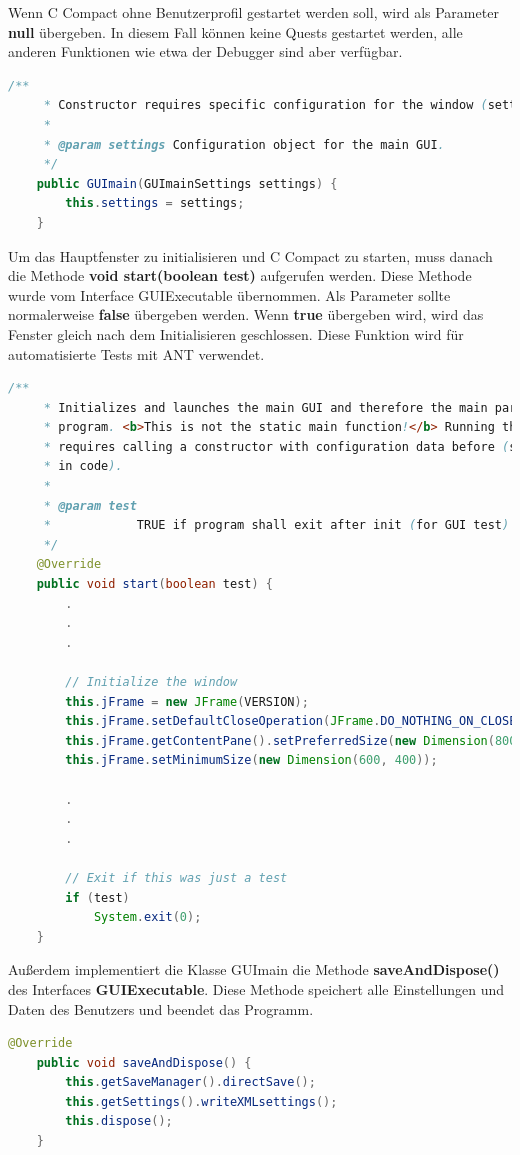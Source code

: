 Wenn C Compact ohne Benutzerprofil gestartet werden soll, wird als Parameter \textbf{null} übergeben. In diesem Fall können keine Quests gestartet werden, alle anderen Funktionen wie etwa der Debugger sind aber verfügbar.

\begin{lstlisting}[language=JAVA]
	/**
	 * Constructor requires specific configuration for the window (settings)
	 * 
	 * @param settings Configuration object for the main GUI.
	 */
	public GUImain(GUImainSettings settings) {
		this.settings = settings;
	}
\end{lstlisting}

Um das Hauptfenster zu initialisieren und C Compact zu starten, muss danach die Methode \textbf{void start(boolean test)} aufgerufen werden. Diese Methode wurde vom Interface GUIExecutable übernommen. Als Parameter sollte normalerweise \textbf{false} übergeben werden. Wenn \textbf{true} übergeben wird, wird das Fenster gleich nach dem Initialisieren geschlossen. Diese Funktion wird für automatisierte Tests mit ANT verwendet.

\begin{lstlisting}[language=JAVA]
	/**
	 * Initializes and launches the main GUI and therefore the main part of the
	 * program. <b>This is not the static main function!</b> Running this method
	 * requires calling a constructor with configuration data before (see above
	 * in code).
	 * 
	 * @param test
	 *            TRUE if program shall exit after init (for GUI test)
	 */
	@Override
	public void start(boolean test) {
		.
		.
		.
			
		// Initialize the window
		this.jFrame = new JFrame(VERSION);
		this.jFrame.setDefaultCloseOperation(JFrame.DO_NOTHING_ON_CLOSE);
		this.jFrame.getContentPane().setPreferredSize(new Dimension(800, 500));
		this.jFrame.setMinimumSize(new Dimension(600, 400));
		
		.
		.
		.
		
		// Exit if this was just a test
		if (test)
			System.exit(0);
	}
\end{lstlisting}

Außerdem implementiert die Klasse GUImain die Methode \textbf{saveAndDispose()} des Interfaces \textbf{GUIExecutable}. Diese Methode speichert alle Einstellungen und Daten des Benutzers und beendet das Programm.

\begin{lstlisting}[language=JAVA]
	@Override
	public void saveAndDispose() {
		this.getSaveManager().directSave();
		this.getSettings().writeXMLsettings();
		this.dispose();
	}
\end{lstlisting}

